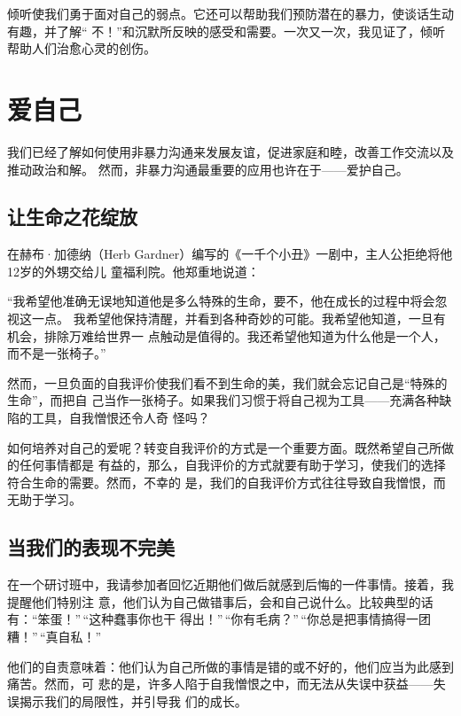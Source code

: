 \documentclass{ctexart}
\renewenvironment{quotation}{\setlength{\parskip}{0.5em}\setstretch{1.5}\kaishu\zihao{-5}\setlength{\parindent}{1em}}{\vspace{1em}}
\begin{document}
倾听使我们勇于面对自己的弱点。它还可以帮助我们预防潜在的暴力，使谈话生动有趣，并了解``
不！''和沉默所反映的感受和需要。一次又一次，我见证了，倾听帮助人们治愈心灵的创伤。

\protect


\section{爱自己}\label{sec:爱自己}

我们已经了解如何使用非暴力沟通来发展友谊，促进家庭和睦，改善工作交流以及推动政治和解。
然而，非暴力沟通最重要的应用也许在于------爱护自己。


\subsection{让生命之花绽放}

在赫布·加德纳（Herb Gardner）编写的《一千个小丑》一剧中，主人公拒绝将他12岁的外甥交给儿
童福利院。他郑重地说道：

\begin{quotation}
	``我希望他准确无误地知道他是多么特殊的生命，要不，他在成长的过程中将会忽视这一点。
	我希望他保持清醒，并看到各种奇妙的可能。我希望他知道，一旦有机会，排除万难给世界一
	点触动是值得的。我还希望他知道为什么他是一个人，而不是一张椅子。''
\end{quotation}

然而，一旦负面的自我评价使我们看不到生命的美，我们就会忘记自己是``特殊的生命''，而把自
己当作一张椅子。如果我们习惯于将自己视为工具------充满各种缺陷的工具，自我憎恨还令人奇
怪吗？

如何培养对自己的爱呢？转变自我评价的方式是一个重要方面。既然希望自己所做的任何事情都是
有益的，那么，自我评价的方式就要有助于学习，使我们的选择符合生命的需要。然而，不幸的
是，我们的自我评价方式往往导致自我憎恨，而无助于学习。


\subsection{当我们的表现不完美}

在一个研讨班中，我请参加者回忆近期他们做后就感到后悔的一件事情。接着，我提醒他们特别注
意，他们认为自己做错事后，会和自己说什么。比较典型的话有：``笨蛋！''\,``这种蠢事你也干
得出！''\,``你有毛病？''\,``你总是把事情搞得一团糟！''\,``真自私！''

他们的自责意味着：他们认为自己所做的事情是错的或不好的，他们应当为此感到痛苦。然而，可
悲的是，许多人陷于自我憎恨之中，而无法从失误中获益------失误揭示我们的局限性，并引导我
们的成长。
\end{document}
